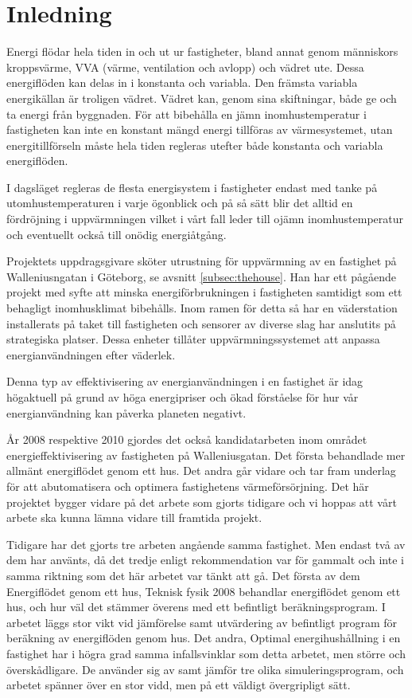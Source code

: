 \chapter{Inledning}

Energi flödar hela tiden in och ut ur fastigheter, bland annat genom människors kroppsvärme, VVA (värme, ventilation och avlopp) och vädret ute. Dessa energiflöden kan delas in i konstanta och variabla. Den främsta variabla energikällan är troligen vädret. Vädret kan, genom sina skiftningar, både ge och ta energi från byggnaden. För att bibehålla en jämn inomhustemperatur i fastigheten kan inte en konstant mängd energi tillföras av värmesystemet, utan energitillförseln måste hela tiden regleras utefter både konstanta och variabla energiflöden.

I dagsläget regleras de flesta energisystem i fastigheter endast med tanke på utomhustemperaturen i varje ögonblick och på så sätt blir det alltid en fördröjning i uppvärmningen vilket i vårt fall leder till ojämn inomhustemperatur och eventuellt också till onödig energiåtgång.

Projektets uppdragsgivare sköter utrustning för uppvärmning av en fastighet på Walleniusngatan i Göteborg, se avsnitt \ref{subsec:thehouse}. Han har ett pågående projekt med syfte att minska energiförbrukningen i fastigheten samtidigt som ett behagligt inomhusklimat bibehålls. Inom ramen för detta så har en väderstation installerats på taket till fastigheten och sensorer av diverse slag har anslutits på strategiska platser.  Dessa enheter tillåter uppvärmningssystemet att anpassa energianvändningen efter väderlek.

Denna typ av effektivisering av energianvändningen i en fastighet är idag högaktuell på grund av höga energipriser och ökad förståelse för hur vår energianvändning kan påverka planeten negativt.

År 2008 respektive 2010 gjordes det också kandidatarbeten inom området energieffektivisering av fastigheten på Walleniusgatan. Det första\cite{kandidatarbete2008} behandlade mer allmänt energiflödet genom ett hus. Det andra\cite{kandidatarbete2010} går vidare och tar fram underlag för att abutomatisera och optimera fastighetens värmeförsörjning. Det här projektet bygger vidare på det arbete som gjorts tidigare och vi hoppas att vårt arbete ska kunna lämna vidare till framtida projekt.

Tidigare har det gjorts tre arbeten angående samma fastighet.  Men endast två av dem har använts, då det tredje enligt rekommendation var för gammalt och inte i samma riktning som det här arbetet var tänkt att gå.
Det första av dem Energiflödet genom ett hus, Teknisk fysik 2008 behandlar energiflödet genom ett hus, och hur väl det stämmer överens med ett befintligt beräkningsprogram. I arbetet läggs stor vikt vid jämförelse samt utvärdering av befintligt program för beräkning av energiflöden genom hus.
Det andra, Optimal energihushållning i en fastighet har i högra grad samma infallsvinklar som detta arbetet, men större och överskådligare. De använder sig av samt jämför tre olika simuleringsprogram, och arbetet spänner över en stor vidd, men på ett väldigt övergripligt sätt.





